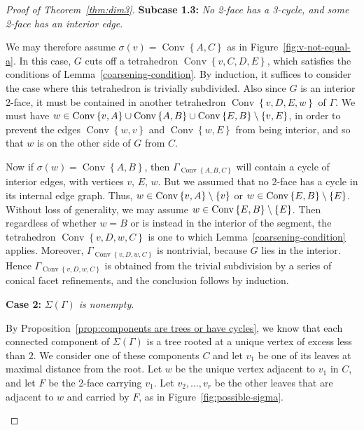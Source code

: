 \documentclass[10pt]{amsart}
\DeclareMathOperator{\Convop}{Conv}
\newcommand{\Conv}[1]{\Convop\left\{{#1}\right\}}
\DeclarePairedDelimiter{\set}{\{}{\}}
\newenvironment{proofsection}[2]{\par\smallskip\noindent\textbf{#1} \emph{#2}.\par\nobreak}{\par\smallskip}
\begin{document}
\begin{proof}[Proof of Theorem~\ref{thm:dim3}]
\begin{proofsection}{Subcase 1.3:}{No 2-face has a 3-cycle, and some 2-face has an interior edge}
 
We may therefore assume $\sigma(v) = \Conv{A,C}$ as in Figure~\ref{fig:v-not-equal-a}. In this case, $G$ cuts off a tetrahedron $\Conv{v,C,D,E}$, which satisfies the conditions of Lemma~\ref{coarsening-condition}. By induction, it suffices to consider the case where this tetrahedron is trivially subdivided. Also since $G$ is an interior 2-face, it must be contained in another tetrahedron $\Conv{v,D,E,w}$ of $\Gamma$. We must have $w\in \Conv{v,A}\cup\Conv{A,B}\cup \Conv{E,B}\setminus\set{v,E}$, in order to prevent the edges $\Conv{w,v}$ and $\Conv{w,E}$ from being interior, and so that $w$ is on the other side of $G$ from $C$.

Now if $\sigma(w)=\Conv{A,B}$, then $\Gamma_{\Conv{A,B,C}}$ will contain a cycle of interior edges, with vertices $v$, $E$, $w$. But we assumed that no 2-face has a cycle in its internal edge graph. Thus, $w\in\Conv{v,A}\setminus \set{v}$ or $w\in\Conv{E,B}\setminus\set{E}$. Without loss of generality, we may assume $w\in\Conv{E,B}\setminus\set{E}$. Then regardless of whether $w=B$ or is instead
in the interior of the segment, the tetrahedron $\Conv{v,D,w,C}$ is one to which Lemma~\ref{coarsening-condition} applies. Moreover, $\Gamma_{\Conv{v,D,w,C}}$ is nontrivial, because $G$ lies in the interior. Hence $\Gamma_{\Conv{v,D,w,C}}$ is obtained from the trivial subdivision by a series of conical facet refinements, and the conclusion follows by induction.
\end{proofsection}

\begin{proofsection}{Case 2:}{$\Sigma(\Gamma)$ is nonempty}

By Proposition~\ref{prop:components are trees or have cycles}, we know
that each connected component of $\Sigma(\Gamma)$ is a tree rooted at a unique vertex of excess less than $2$. We consider one of these components $C$ and let $v_1$ be one of its leaves at maximal distance from the root. Let $w$ be the unique vertex adjacent to $v_1$ in $C$, and let $F$ be the 2-face carrying $v_1$. Let $v_2, \dots, v_r$ be the other leaves that are adjacent to $w$ and carried by $F$, as in Figure~\ref{fig:possible-sigma}. 

\begin{figure}[htb]\centering
\vspace*{-2mm}



\end{figure}
\end{proofsection}
\end{proof}
\end{document}
